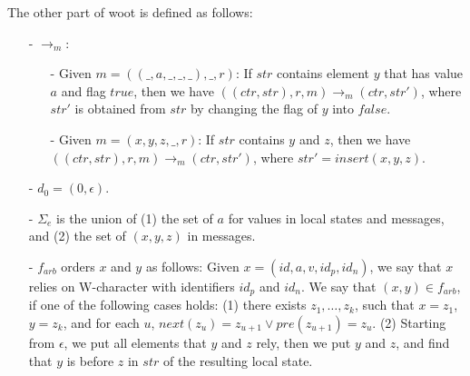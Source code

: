 The other part of woot is defined as follows:

\begin{itemize}
\setlength{\itemsep}{0.5pt}
\item[-] $\rightarrow_m$:
    \begin{itemize}
    \setlength{\itemsep}{0.5pt}
    \item[-] Given $m=((\_,a,\_,\_,\_),\_,r)$: If $str$ contains element $y$ that has value $a$ and flag $\mathit{true}$, then we have $((ctr,str),r,m) \rightarrow_m (ctr,str')$, where $str'$ is obtained from $str$ by changing the flag of $y$ into $\mathit{false}$.

    \item[-] Given $m=(x,y,z,\_,r)$: If $str$ contains $y$ and $z$, then we have $((ctr,str),r,m) \rightarrow_m (ctr,str')$, where $str' = \mathit{insert}(x,y,z)$.
    \end{itemize}

\item[-] $d_0 = (0,\epsilon)$.

\item[-] $\Sigma_e$ is the union of (1) the set of $a$ for values in local states and messages, and (2) the set of $(x,y,z)$ in messages. 

\item[-] $f_{arb}$ orders $x$ and $y$ as follows: Given $x = (id,a,v,id_p,id_n)$, we say that $x$ relies on W-character with identifiers $id_p$ and $id_n$. We say that $(x,y) \in f_{arb}$, if one of the following cases holds: (1) there exists $z_1,\ldots,z_k$, such that $x=z_1$, $y=z_k$, and for each $u$, $next(z_u)=z_{u+1} \vee pre(z_{u+1}) = z_u$. (2) Starting from $\epsilon$, we put all elements that $y$ and $z$ rely, then we put $y$ and $z$, and find that $y$ is before $z$ in $str$ of the resulting local state. 
\end{itemize}


















